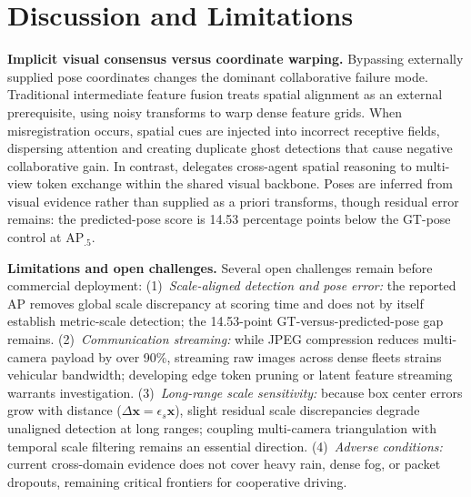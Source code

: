 \section{Discussion and Limitations}
\label{sec:discussion}
\textbf{Implicit visual consensus versus coordinate warping.} Bypassing externally supplied pose coordinates changes the dominant collaborative failure mode. Traditional intermediate feature fusion treats spatial alignment as an external prerequisite, using noisy transforms to warp dense feature grids. When misregistration occurs, spatial cues are injected into incorrect receptive fields, dispersing attention and creating duplicate ghost detections that cause negative collaborative gain. In contrast, \method{} delegates cross-agent spatial reasoning to multi-view token exchange within the shared visual backbone. Poses are inferred from visual evidence rather than supplied as a priori transforms, though residual error remains: the predicted-pose score is 14.53 percentage points below the GT-pose control at AP$_{.5}$.

\textbf{Limitations and open challenges.} Several open challenges remain before commercial deployment: (1)~\emph{Scale-aligned detection and pose error:} the reported AP removes global scale discrepancy at scoring time and does not by itself establish metric-scale detection; the 14.53-point GT-versus-predicted-pose gap remains. (2)~\emph{Communication streaming:} while JPEG compression reduces multi-camera payload by over 90\%, streaming raw images across dense fleets strains vehicular bandwidth; developing edge token pruning or latent feature streaming warrants investigation. (3)~\emph{Long-range scale sensitivity:} because box center errors grow with distance ($\Delta \mathbf{x} = \epsilon_s \mathbf{x}$), slight residual scale discrepancies degrade unaligned detection at long ranges; coupling multi-camera triangulation with temporal scale filtering remains an essential direction. (4)~\emph{Adverse conditions:} current cross-domain evidence does not cover heavy rain, dense fog, or packet dropouts, remaining critical frontiers for cooperative driving.
